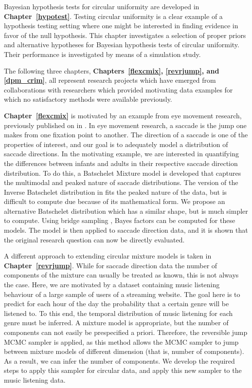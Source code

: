 \documentclass[12pt, a4paper]{book}\usepackage[]{graphicx}\usepackage{xcolor}
\begin{document}
Bayesian hypothesis tests for circular uniformity are developed in \textbf{Chapter~\ref{hypotest}}. Testing circular uniformity is a clear example of a hypothesis testing setting where one might be interested in finding evidence in favor of the null hypothesis. This chapter investigates a selection of proper priors and alternative hypotheses for Bayesian hypothesis tests of circular uniformity. Their performance is investigated by means of a simulation study.

The following three chapters, \textbf{Chapters~\ref{flexcmix}, \ref{revrjump}, and \ref{dpm_crim}}, all represent research projects which have emerged from collaborations with researchers which provided motivating data examples for which no satisfactory methods were available previously.

\textbf{Chapter~\ref{flexcmix}} is motivated by an example from eye movement research, previously published on in \citet{van2016infants}. In eye movement research, a saccade is the jump one makes from one fixation point to another. The direction of a saccade is one of the properties of interest, and our goal is to adequately model a distribution of saccade directions. In the motivating example, we are interested in quantifying the differences between infants and adults in their respective saccade direction distribution. To do this, a Batschelet Mixture model is developed that captures the multimodal and peaked nature of saccade distributions. The version of the Inverse Batschelet distribution in \citet{jones2012inverse} fits the peaked nature of the data, but is difficult to compute due because of its mathematical form. We propose an alternative Batschelet distribution which has a similar shape, but is much simpler to compute. Using bridge sampling \citep{meng1996simulating, gronau2017tutorial}, Bayes factors can be computed for these models. The model is then applied to saccade direction data, and it is shown that the original research question can now be directly evaluated.

A different approach to extending circular mixture models is taken in \textbf{Chapter~\ref{revrjump}}. While for saccade direction data the number of components of the mixture can usually be treated as known, this is not always the case. Here, we are motivated by a dataset containing music listening behaviour of a large sample of users of a streaming website. The goal here is to predict for each hour of the day the probability that a certain genre will be listened to. To this end, the temporal distribution of music listening for each genre must be inferred. A mixture model is appropriate, but the number of components can not easily be prespecified a priori. Therefore, the reversible jump MCMC sampler \citep{richardson1997bayesian} is applied, as this method allows the MCMC sampler to jump between mixture models of different dimension (that is, number of components). As a result, we can infer the number of components. We develop the required steps to apply this sampler for circular data, and apply this new sampler to the music listening data.
\end{document}
